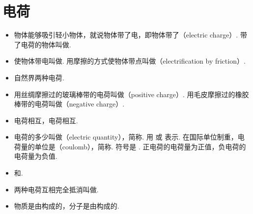 \newpage
\section{电荷}

\vspace{10pt}
\begin{itemize}
\item 物体能够吸引轻小物体，就说物体带了电，即物体带了（electric charge）. 带了电荷的物体叫做.
\item 使物体带电叫做. 用摩擦的方式使物体带点叫做（electrification by friction）.
\item 自然界两种电荷.
\item 用丝绸摩擦过的玻璃棒带的电荷叫做（positive charge）. 用毛皮摩擦过的橡胶棒带的电荷叫做（negative charge）.
\item {}电荷相互，电荷相互.
\item 电荷的多少叫做（electric quantity），简称. 用  或  表示. 在国际单位制重，电荷量的单位是（coulomb），简称. 符号是 . 正电荷的电荷量为正值，负电荷的电荷量为负值.
\item {}和.
\item 两种电荷互相完全抵消叫做.
\item 物质是由构成的，分子是由构成的.
\end{itemize}